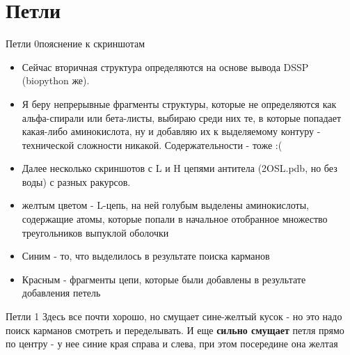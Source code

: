 \documentclass[10pt, xcolor={dvipsnames}]{beamer}
\begin{document}
\section{Петли}
\begin{frame}{Петли 0}{пояснение к скриншотам}
\begin{itemize}
\item Сейчас вторичная структура определяются на основе вывода DSSP (biopython же).

\item Я беру непрерывные фрагменты структуры, которые не определяются как альфа-спирали или бета-листы, выбираю среди них те, в которые попадает какая-либо аминокислота, ну и добавляю их к выделяемому контуру - технической сложности никакой. Содержательности - тоже :(

\item Далее несколько скриншотов с L и H цепями антитела (2OSL.pdb, но без воды) с разных ракурсов.

\item желтым цветом - L-цепь, на ней голубым выделены аминокислоты, содержащие атомы, которые попали в начальное отобранное множество треугольников выпуклой оболочки

\item Синим - то, что выделилось в результате поиска карманов

\item Красным - фрагменты цепи, которые были добавлены в результате добавления петель

\end{itemize}
\end{frame}
\begin{frame}{Петли 1}
Здесь все почти хорошо, но смущает сине-желтый кусок - но это надо поиск карманов смотреть и переделывать. И еще \textbf{сильно смущает} петля прямо по центру - у нее синие края справа и слева, при этом посередине она желтая
\begin{center}
\end{center}

\end{frame}
\end{document}
